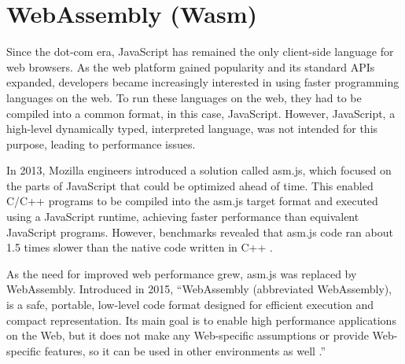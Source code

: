 \chapter{WebAssembly (Wasm)}
\label{chap:wasm}

Since the dot-com era, JavaScript has remained the only client-side language for web browsers. 
As the web platform gained popularity and its standard APIs expanded, developers became increasingly interested in using faster programming languages on the web. 
To run these languages on the web, they had to be compiled into a common format, in this case, JavaScript. However, JavaScript, a high-level dynamically typed, interpreted language, was not intended for this purpose, leading to performance issues.

In 2013, Mozilla engineers introduced a solution called asm.js, which focused on the parts of JavaScript that could be optimized ahead of time. This enabled C/C++ programs to be compiled into the asm.js target format and executed using a JavaScript runtime, 
achieving faster performance than equivalent JavaScript programs. However, benchmarks revealed that asm.js code ran about 1.5 times slower than the native code written in C++ \cite{zakai_2013_gap}.

As the need for improved web performance grew, asm.js was replaced by WebAssembly. Introduced in 2015, “WebAssembly (abbreviated \Gls{WebAssembly}), is a safe, portable, low-level code format designed for efficient execution and compact representation. 
Its main goal is to enable high performance applications on the Web, but it does not make any Web-specific assumptions or provide Web-specific features, so it can be used in other environments as well \cite[p. 1]{webassemblycommunitygroup_2023_webassembly}.”
